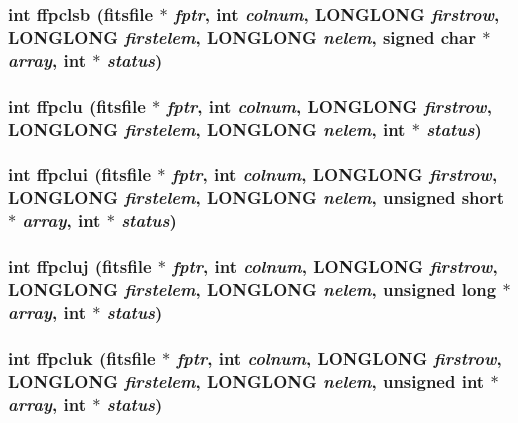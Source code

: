 \subsubsection{\setlength{\rightskip}{0pt plus 5cm}int ffpclsb (\bf{fitsfile} $\ast$ {\em fptr}, int {\em colnum}, \bf{LONGLONG} {\em firstrow}, \bf{LONGLONG} {\em firstelem}, \bf{LONGLONG} {\em nelem}, signed char $\ast$ {\em array}, int $\ast$ {\em status})}\label{fitsio_8h_3c19da60283d0f6c16d2c4508ee2b551}


\subsubsection{\setlength{\rightskip}{0pt plus 5cm}int ffpclu (\bf{fitsfile} $\ast$ {\em fptr}, int {\em colnum}, \bf{LONGLONG} {\em firstrow}, \bf{LONGLONG} {\em firstelem}, \bf{LONGLONG} {\em nelem}, int $\ast$ {\em status})}\label{fitsio_8h_d0b72bec18b86400b6610d40ef80e0a4}


\subsubsection{\setlength{\rightskip}{0pt plus 5cm}int ffpclui (\bf{fitsfile} $\ast$ {\em fptr}, int {\em colnum}, \bf{LONGLONG} {\em firstrow}, \bf{LONGLONG} {\em firstelem}, \bf{LONGLONG} {\em nelem}, unsigned short $\ast$ {\em array}, int $\ast$ {\em status})}\label{fitsio_8h_dbc957468fec6139e57ddb838f5782a7}


\subsubsection{\setlength{\rightskip}{0pt plus 5cm}int ffpcluj (\bf{fitsfile} $\ast$ {\em fptr}, int {\em colnum}, \bf{LONGLONG} {\em firstrow}, \bf{LONGLONG} {\em firstelem}, \bf{LONGLONG} {\em nelem}, unsigned long $\ast$ {\em array}, int $\ast$ {\em status})}\label{fitsio_8h_93be7636ae678f27fed9c25ca171c009}


\subsubsection{\setlength{\rightskip}{0pt plus 5cm}int ffpcluk (\bf{fitsfile} $\ast$ {\em fptr}, int {\em colnum}, \bf{LONGLONG} {\em firstrow}, \bf{LONGLONG} {\em firstelem}, \bf{LONGLONG} {\em nelem}, unsigned int $\ast$ {\em array}, int $\ast$ {\em status})}\label{fitsio_8h_b4d5611f33c75c133789ec5742f76240}


